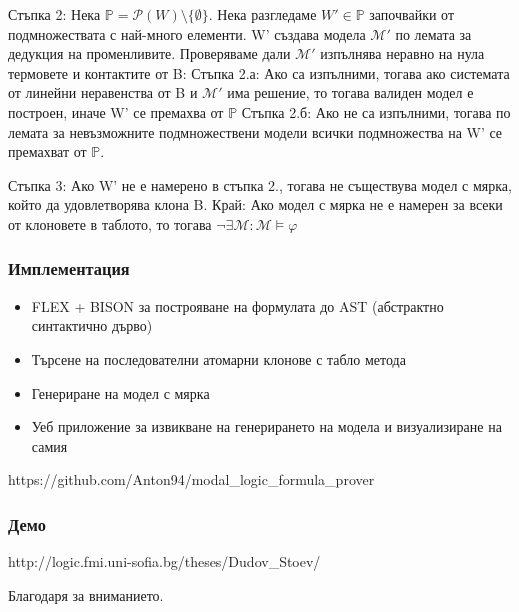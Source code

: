 \documentclass{beamer}
\begin{document}
\begin{frame}
Стъпка 2:
\newline
Нека $\mathbb{P} = \mathcal{P}(W) \setminus \{\emptyset\}$. Нека разгледаме $W' \in \mathbb{P}$ започвайки от подмножествата с най-много елементи.
			W' създава модела $\mathcal{M'}$ по лемата за дедукция на променливите.
			Проверяваме дали $\mathcal{M'}$ изпълнява неравно на нула термовете и контактите от B:
\newline
\newline
Стъпка 2.а:
\newline
 Ако са изпълними, тогава ако системата от линейни неравенства от B и $\mathcal{M'}$ има решение, то тогава валиден модел е построен, иначе W' се премахва от $\mathbb{P}$
\newline
\newline
Стъпка 2.б:
\newline
Ако не са изпълними, тогава по лемата за невъзможните подмножествени модели всички подмножества на W' се премахват от $\mathbb{P}$.
\end{frame}

\begin{frame}
Стъпка 3:
\newline
Ако W' не е намерено в стъпка 2., тогава не съществува модел с мярка, който да удовлетворява клона B.
\newline
\newline
Край:
\newline
Ако модел с мярка не е намерен за всеки от клоновете в таблото, то тогава $\neg \exists \mathcal{M}: \mathcal{M} \models \varphi$ 

\end{frame}

\begin{frame}\frametitle{Имплементация}
\begin{itemize}
	\item FLEX + BISON за построяване на формулата до AST (абстрактно синтактично дърво)
	\item Търсене на последователни атомарни клонове с табло метода
	\item Генериране на модел с мярка
	\item Уеб приложение за извикване на генерирането на модела и визуализиране на самия
\end{itemize}
 https://github.com/Anton94/modal\_logic\_formula\_prover
\end{frame}

\begin{frame}\frametitle{Демо}
http://logic.fmi.uni-sofia.bg/theses/Dudov\_Stoev/
\end{frame}

\begin{frame}
Благодаря за вниманието.
\end{frame}
\end{document}
